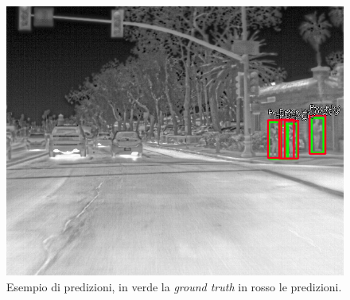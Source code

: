 \begin{figure}[]
{{\begin{minipage}[b][][t]{.3\textwidth}
        \includegraphics[width=.8\textwidth]{images/examples/first_flir_test/35.png}
        \end{minipage}
    }
    }
    \caption{Esempio di predizioni, in verde la \textit{ground truth} in rosso le predizioni.} 
    \label{fig:examples_first} 
\end{figure} 
